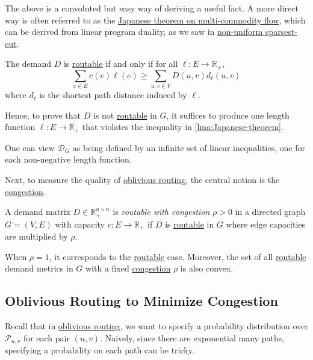 The above is a convoluted but easy way of deriving a useful fact. A more direct way is often referred to as the \hyperref[lma:Japanese-theorem]{Japanese theorem on multi-commodity flow}, which can be derived from linear program duality, as we saw in \hyperref[prb:non-uniform-sparsest-cut]{non-uniform sparsest-cut}.

\begin{lemma}\label{lma:Japanese-theorem}
	The demand \(D\) is \hyperref[def:routable]{routable} if and only if for all \(\ell \colon E \to \mathbb{R} _+\),
	\[
		\sum_{e \in E} c(e) \ell (e) \geq \sum_{u, v \in V} D(u, v) d_{\ell } (u, v)
	\]
	where \(d_{\ell } \) is the shortest path distance induced by \(\ell \).
\end{lemma}

Hence, to prove that \(D\) is not \hyperref[def:routable]{routable} in \(G\), it suffices to produce one length function \(\ell \colon E \to \mathbb{R} _+\) that violates the inequality in \autoref{lma:Japanese-theorem}.

\begin{intuition}
	One can view \(\mathcal{D} _G\) as being defined by an infinite set of linear inequalities, one for each non-negative length function.
\end{intuition}

Next, to measure the quality of \hyperref[prb:oblivious-routing]{oblivious routing}, the central notion is the \hyperref[def:congestion]{congestion}.

\begin{definition}[Congestion]\label{def:congestion}
	A demand matrix \(D \in \mathbb{R} _+^{n \times n}\) is \emph{routable with congestion} \(\rho > 0\) in a directed graph \(G = (V, E)\) with capacity \(c \colon E \to \mathbb{R} _+\) if \(D\) is \hyperref[def:routable]{routable} in \(G\) where edge capacities are multiplied by \(\rho \).
\end{definition}

When \(\rho = 1\), it corresponds to the \hyperref[def:routable]{routable} case. Moreover, the set of all \hyperref[def:routable]{routable} demand metrics in \(G\) with a fixed \hyperref[def:congestion]{congestion} \(\rho \) is also convex.

\subsection{Oblivious Routing to Minimize Congestion}
Recall that in \hyperref[prb:oblivious-routing]{oblivious routing}, we want to specify a probability distribution over \(\mathcal{P} _{u, v}\) for each pair \((u, v)\). Naively, since there are exponential many paths, specifying a probability on each path can be tricky.

